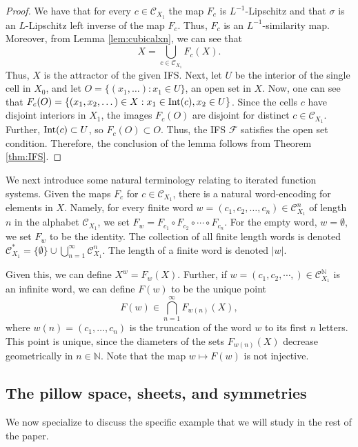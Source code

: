 \documentclass{amsart}
\theoremstyle{plain}
\theoremstyle{definition}
\numberwithin{equation}{section}
\numberwithin{theorem}{section}
\newcommand{\N}{\mathbb{N}}
\newcommand{\cF}{\mathcal{F}}
\newcommand{\cC}{\mathcal{C}}
\begin{document}
\begin{proof}
    We have that for every $c\in \cC_{X_1}$ the map $F_c$ is $L^{-1}$-Lipschitz and that $\sigma$ is an $L$-Lipschitz left inverse of the map $F_c$. Thus, $F_c$ is an $L^{-1}$-similarity map. Moreover, from Lemma \ref{lem:cubicalxn}, we can see that
    \[
    X=\bigcup_{c\in \cC_{X_1}} F_c(X).
    \]
    Thus, $X$ is the attractor of the given IFS. Next, let $U$ be the interior of the single cell in $X_0$, and let $O=\{(x_1,\dots): x_1\in U\}$, an open set in $X$. Now, one can see that $F_c(O)=\{(x_1,x_2, \dots) \in X : x_1 \in {\rm Int}(c), x_2\in U\}$. Since the cells $c$ have disjoint interiors in $X_1$, the images $F_c(O)$ are disjoint for distinct $c\in \cC_{X_1}$.  Further, ${\rm Int}(c)\subset U$, so $F_c(O)\subset O$. Thus, the IFS $\cF$ satisfies the open set condition. Therefore, the conclusion of the lemma follows from Theorem \ref{thm:IFS}. 
\end{proof}

We next introduce some natural terminology relating to iterated function systems. 
Given the maps $F_c$ for $c\in \cC_{X_1}$, there is a natural word-encoding for elements in $X$. Namely, for every finite word $w=(c_1, c_2, \dots, c_n) \in \cC_{X_1}^n$ of length $n$ in the alphabet $\cC_{X_1}$, we set $F_w = F_{c_1}\circ F_{c_2} \circ \cdots \circ F_{c_n}$. For the empty word, $w=\emptyset$, we set $F_w$ to be the identity. The collection of all finite length words is denoted $\cC_{X_1}^*=\{\emptyset\} \cup \bigcup_{n=1}^\infty \cC_{X_1}^n.$ The length of a finite word is denoted $|w|$.

Given this, we can define $X^w = F_w(X)$. Further, if $w=(c_1,c_2, \cdots, )\in \cC_{X_1}^\N$ is an infinite word, we can define $F(w)$ to be the unique point
\[
F(w) \in \bigcap_{n=1}^\infty F_{w(n)}(X),
\]
where $w(n) = (c_1, \dots, c_n)$ is the truncation of the word $w$ to its first $n$ letters. This point is unique, since the diameters of the sets $F_{w(n)}(X)$ decrease geometrically in $n\in \N$. Note that the map $w\mapsto F(w)$ is not injective.

\subsection{The pillow space, sheets, and symmetries}\label{subsec:pillowspace}

We now specialize to discuss the specific example that we will study in the rest of the paper.
\end{document}

